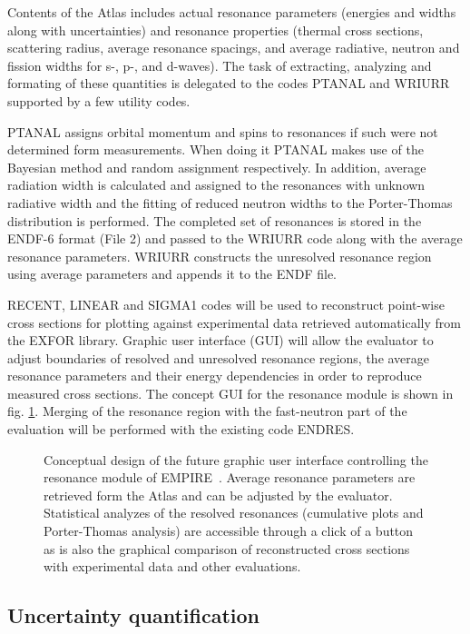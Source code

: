 Contents of the Atlas includes actual resonance parameters (energies and
widths along with uncertainties) and resonance properties (thermal cross
sections, scattering radius, average resonance spacings, and average
radiative, neutron and fission widths for s-, p-, and d-waves). The task of
extracting, analyzing and formating of these quantities is delegated to the
codes PTANAL and WRIURR~\cite{Oh:00} supported by a few utility codes.

PTANAL assigns orbital momentum and spins to resonances if such were not
determined form measurements. When doing it PTANAL makes use of the Bayesian
method and random assignment respectively. In addition, average radiation
width is calculated and assigned to the resonances with unknown radiative
width and the fitting of reduced neutron widths to the Porter-Thomas
distribution is performed. The completed set of resonances is stored in the
ENDF-6 format (File 2) and passed to the WRIURR code along with the average
resonance parameters. WRIURR constructs the unresolved resonance region
using average parameters and appends it to the ENDF file.

RECENT, LINEAR and SIGMA1 codes will be used to reconstruct point-wise cross
sections for plotting against experimental data retrieved automatically from
the EXFOR library. Graphic user interface (GUI) will allow the evaluator to
adjust boundaries of resolved and unresolved resonance regions, the average
resonance parameters and their energy dependencies in order to reproduce
measured cross sections. The concept GUI for the resonance module is shown
in fig. \ref{fig:res-GUI}. Merging of the resonance region with the
fast-neutron part of the evaluation will be performed with the existing code
ENDRES.

\begin{figure}[htpb]
\caption{Conceptual design of the future graphic user interface controlling
the resonance module of EMPIRE~\protect\cite{Cho:07}. Average resonance
parameters are retrieved form the Atlas and can be adjusted by the
evaluator. Statistical analyzes of the resolved resonances (cumulative plots
and Porter-Thomas analysis) are accessible through a click of a button as is
also the graphical comparison of reconstructed cross sections with
experimental data and other evaluations.}
\label{fig:res-GUI}
\end{figure}

\subsection{Uncertainty quantification}

